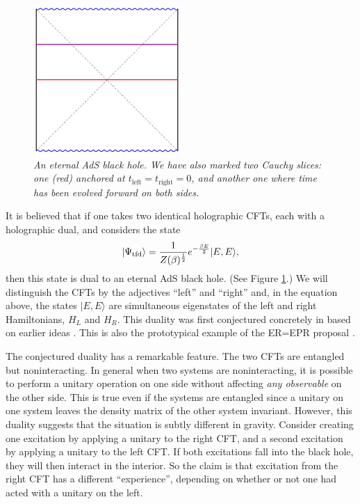 \documentclass[12pt]{article}
\newcommand{\tfd}{\Psi_{\text{tfd}}} %
\newcommand{\be}{\begin{equation}}
\newcommand{\ee}{\end{equation}}
\begin{document}
\begin{figure}[!ht]
\begin{center}
\includegraphics[width=0.5\textwidth]{eternalbh.pdf}
\caption{\em An eternal AdS black hole. We have also marked two Cauchy slices: one (red) anchored at $t_{\text{left}} = t_{\text{right}} = 0$, and another one where time has been evolved forward on both sides. \label{figeternal}}
\end{center}
\end{figure}
It is believed that if one takes two identical holographic CFTs,  each with a holographic dual, and considers the state
\be
\label{thermofielddefn}
|\tfd \rangle = {1 \over Z(\beta)^{1 \over 2}} e^{-{\beta E \over 2}} |E, E \rangle,
\ee
then this state is dual to an eternal AdS black hole. (See Figure \ref{figeternal}.) We will distinguish the CFTs by the adjectives ``left'' and ``right'' and, in the equation above, the states $|E, E \rangle$ are simultaneous eigenstates of the left and right Hamiltonians, $H_L$ and $H_R$. This duality was first conjectured concretely in \cite{Maldacena:2001kr} based on earlier ideas \cite{Israel:1976ur}. This is also the prototypical example of the ER=EPR proposal \cite{Maldacena:2013xja}.

The conjectured duality has a remarkable feature.  The two CFTs are entangled but noninteracting. In general when two systems are noninteracting, it is possible to perform a unitary operation on one side without affecting {\em any observable} on the other side. This is true even if the systems
are entangled since a unitary on one system leaves the density matrix of the other system invariant. However, this duality suggests that the situation is subtly  different in gravity. Consider creating one excitation by applying a unitary to the right CFT, and a second excitation by applying a unitary to the left CFT. If both excitations fall into the black hole, they will then interact in the interior. So the claim is that excitation from the right CFT has a different ``experience'', depending on whether or not one had acted with a unitary on the left.
\end{document}
